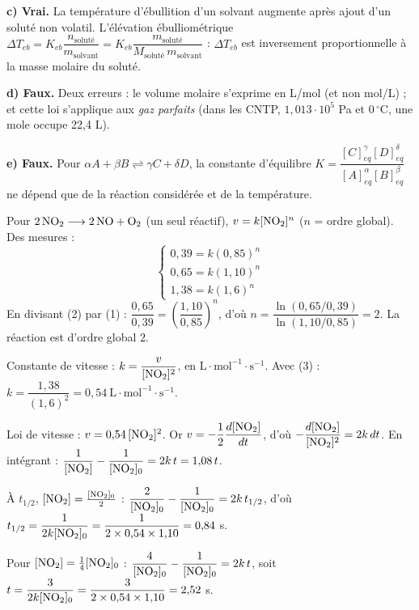 \documentclass[11pt]{article}
\begin{document}
\textbf{c) Vrai.} La température d'ébullition d'un solvant augmente après ajout d'un soluté non volatil. L'élévation ébulliométrique $\Delta T_{eb} = K_{eb}\dfrac{n_{\text{soluté}}}{m_{\text{solvant}}} = K_{eb}\dfrac{m_{\text{soluté}}}{M_{\text{soluté}}\,m_{\text{solvant}}}$ : $\Delta T_{eb}$ est inversement proportionnelle à la masse molaire du soluté.

\textbf{d) Faux.} Deux erreurs : le volume molaire s'exprime en L/mol (et non mol/L) ; et cette loi s'applique aux \emph{gaz parfaits} (dans les CNTP, $1{,}013\cdot10^{5}$ Pa et $0\,^\circ$C, une mole occupe 22,4 L).

\textbf{e) Faux.} Pour $\alpha A + \beta B \rightleftharpoons \gamma C + \delta D$, la constante d'équilibre $K = \dfrac{[C]_{eq}^{\gamma}[D]_{eq}^{\delta}}{[A]_{eq}^{\alpha}[B]_{eq}^{\beta}}$ ne dépend que de la réaction considérée et de la température.


 Pour $\mathrm{2\,NO_2 \longrightarrow 2\,NO + O_2}$ (un seul réactif), $v = k[\mathrm{NO_2}]^n$ ($n$ = ordre global). Des mesures :
\[ \begin{cases} 0{,}39 = k(0{,}85)^n \\ 0{,}65 = k(1{,}10)^n \\ 1{,}38 = k(1{,}6)^n \end{cases} \]
En divisant (2) par (1) : $\dfrac{0{,}65}{0{,}39} = \left(\dfrac{1{,}10}{0{,}85}\right)^n$, d'où $n = \dfrac{\ln(0{,}65/0{,}39)}{\ln(1{,}10/0{,}85)} = 2$. La réaction est d'ordre global 2.

Constante de vitesse : $k = \dfrac{v}{[\mathrm{NO_2}]^2}$, en $\text{L}\cdot\text{mol}^{-1}\cdot\text{s}^{-1}$. Avec (3) : $k = \dfrac{1{,}38}{(1{,}6)^2} = 0{,}54\ \text{L}\cdot\text{mol}^{-1}\cdot\text{s}^{-1}$.

 Loi de vitesse : $v = 0{,}54\,[\mathrm{NO_2}]^2$. Or $v = -\dfrac{1}{2}\dfrac{d[\mathrm{NO_2}]}{dt}$, d'où $-\dfrac{d[\mathrm{NO_2}]}{[\mathrm{NO_2}]^2} = 2k\,dt$. En intégrant : $\dfrac{1}{[\mathrm{NO_2}]} - \dfrac{1}{[\mathrm{NO_2}]_0} = 2k\,t = 1{,}08\,t$.

 À $t_{1/2}$, $[\mathrm{NO_2}] = \frac{[\mathrm{NO_2}]_0}{2}$ : $\dfrac{2}{[\mathrm{NO_2}]_0} - \dfrac{1}{[\mathrm{NO_2}]_0} = 2k\,t_{1/2}$, d'où $t_{1/2} = \dfrac{1}{2k[\mathrm{NO_2}]_0} = \dfrac{1}{2\times 0{,}54\times 1{,}10} = 0{,}84$ s.

 Pour $[\mathrm{NO_2}] = \frac{1}{4}[\mathrm{NO_2}]_0$ : $\dfrac{4}{[\mathrm{NO_2}]_0} - \dfrac{1}{[\mathrm{NO_2}]_0} = 2k\,t$, soit $t = \dfrac{3}{2k[\mathrm{NO_2}]_0} = \dfrac{3}{2\times 0{,}54\times 1{,}10} = 2{,}52$ s.
\end{document}
